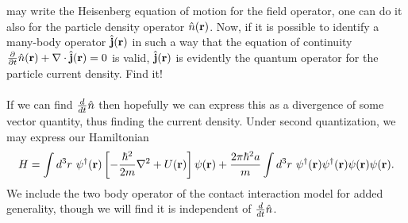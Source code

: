\documentclass[10pt,letterpaper]{article}
\begin{document}
may write the Heisenberg equation of motion for the field operator, one can do it also for the particle density operator
$\hat n(\mathbf{r})$. Now, if it is possible to identify a many-body operator $\hat{\mathbf{j}}(\mathbf{r})$ in such a way that the equation
of continuity $\frac{\partial}{\partial t} \hat n(\mathbf{r})+\nabla\cdot\hat{\mathbf{j}}(\mathbf{r}) = 0$ is valid, $\hat{\mathbf{j}}(\mathbf{r})$ is evidently the quantum
operator for the particle current density. Find it!
\\ \\
If we can find $\frac{d}{dt}\hat n$ then hopefully we can express this as a divergence of some vector quantity, thus finding
the current density. Under second quantization, we may express our Hamiltonian 
\[
	H = \int d^3r\ \psi^\dag(\vect r)\blr{ -\frac{\h^2}{2m}\del^2+U(\vect r)}\psi(\vect r)+
	\frac{2\pi\h^2 a}{m}\int d^3r\ \psi^\dag(\vect r)\psi^\dag(\vect r)\psi(\vect r)\psi(\vect r).
\]
We include the two body operator of the contact interaction model for added generality, though we will find it is independent of
 $\frac{d}{dt}\hat n$.
\end{document}
